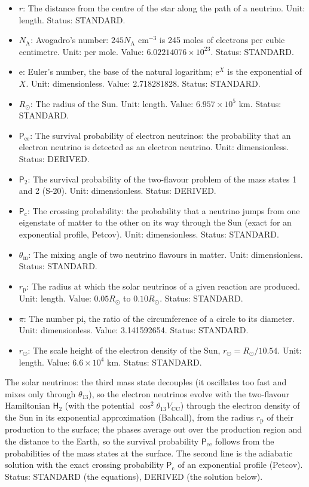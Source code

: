 \documentclass[
  10pt,
]{article}
\begin{document}
\begin{itemize}
\item
  \(r\): The distance from the centre of the star along the path of a
  neutrino. Unit: length. Status: STANDARD.
\item
  \(N_{\mathrm{A}}\): Avogadro's number: \(245N_{\mathrm{A}}\)
  cm\(^{-3}\) is 245 moles of electrons per cubic centimetre. Unit: per
  mole. Value: \(6.02214076\times10^{23}\). Status: STANDARD.
\item
  \(\mathrm{e}\): Euler's number, the base of the natural logarithm;
  \(\mathrm{e}^{X}\) is the exponential of \(X\). Unit: dimensionless.
  Value: 2.718281828. Status: STANDARD.
\item
  \(R_\odot\): The radius of the Sun. Unit: length. Value:
  \(6.957\times10^5\) km. Status: STANDARD.
\item
  \(\mathsf{P}_{\mathrm{ee}}\): The survival probability of electron
  neutrinos: the probability that an electron neutrino is detected as an
  electron neutrino. Unit: dimensionless. Status: DERIVED.
\item
  \(\mathsf{P}_{2}\): The survival probability of the two-flavour
  problem of the mass states 1 and 2 (S-20). Unit: dimensionless.
  Status: DERIVED.
\item
  \(\mathsf{P}_{\mathrm{c}}\): The crossing probability: the probability
  that a neutrino jumps from one eigenstate of matter to the other on
  its way through the Sun (exact for an exponential profile, Petcov).
  Unit: dimensionless. Status: STANDARD.
\item
  \(\theta_{\mathrm{m}}\): The mixing angle of two neutrino flavours in
  matter. Unit: dimensionless. Status: STANDARD.
\item
  \(r_{\mathrm{p}}\): The radius at which the solar neutrinos of a given
  reaction are produced. Unit: length. Value: \(0.05R_\odot\) to
  \(0.10R_\odot\). Status: STANDARD.
\item
  \(\pi\): The number pi, the ratio of the circumference of a circle to
  its diameter. Unit: dimensionless. Value: 3.141592654. Status:
  STANDARD.
\item
  \(r_\odot\): The scale height of the electron density of the Sun,
  \(r_\odot = R_\odot/10.54\). Unit: length. Value: \(6.6\times10^4\)
  km. Status: STANDARD.
\end{itemize}

The solar neutrinos: the third mass state decouples (it oscillates too
fast and mixes only through \(\theta_{13}\)), so the electron neutrinos
evolve with the two-flavour Hamiltonian \(\mathsf{H}_{2}\) (with the
potential \(\cos^2\theta_{13}V_{\mathrm{CC}}\)) through the electron
density of the Sun in its exponential approximation (Bahcall), from the
radius \(r_{\mathrm{p}}\) of their production to the surface; the phases
average out over the production region and the distance to the Earth, so
the survival probability \(\mathsf{P}_{\mathrm{ee}}\) follows from the
probabilities of the mass states at the surface. The second line is the
adiabatic solution with the exact crossing probability
\(\mathsf{P}_{\mathrm{c}}\) of an exponential profile (Petcov). Status:
STANDARD (the equations), DERIVED (the solution below).
\end{document}
